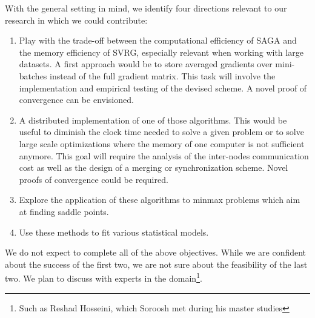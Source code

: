 \documentclass[a4paper,11pt]{article}
\begin{document}
With the general setting in mind, we identify four directions relevant to our
research in which we could contribute:
\begin{enumerate}
	\item Play with the trade-off between the computational efficiency of SAGA
		and the memory efficiency of SVRG, especially relevant when working with
		large datasets. A first approach would be to store averaged gradients
		over mini-batches instead of the full gradient matrix. This task will
		involve the implementation and empirical testing of the devised scheme.
		A novel proof of convergence can be envisioned.
	\item A distributed implementation of one of those algorithms. This would be
		useful to diminish the clock time needed to solve a given problem or to
		solve large scale optimizations where the memory of one computer is not
		sufficient anymore. This goal will require the analysis of the
		inter-nodes communication cost as well as the design of a merging or
		synchronization scheme. Novel proofs of convergence could be required.
	\item Explore the application of these algorithms to minmax problems which
		aim at finding saddle points.
	\item Use these methods to fit various statistical models.
\end{enumerate}

We do not expect to complete all of the above objectives. While we are confident
about the success of the first two, we are not sure about the feasibility of the
last two. We plan to discuss with experts in the domain\footnote{Such as Reshad
Hosseini, which Soroosh met during his master studies}.

\end{document}

